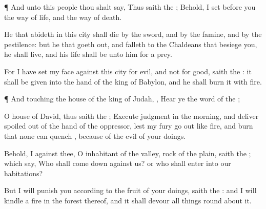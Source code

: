 {\par }{\PP {}¶ And unto this
people thou shalt
say, Thus
saith the
{}; Behold, I
set
before you the
way of
life, and the
way of
death.

He that
abideth in this
city shall
die by the
sword, and by the
famine, and by the
pestilence: but he that goeth
out, and
falleth to the
Chaldeans that
besiege you, he shall
live, and his
life shall be unto him for a
prey.

For I have
set my
face against this
city for
evil, and not for
good,
saith the
{}: it shall be
given into the
hand of the
king of
Babylon, and he shall
burn it with
fire.


\par }{\PP {}¶ And touching the
house of the
king of
Judah,
{},
Hear ye the
word of the
{};

O
house of
David, thus
saith the
{};
Execute
judgment in the
morning, and
deliver
{}
spoiled out of the
hand of the
oppressor, lest my
fury go
out like
fire, and
burn that none can
quench
{},
because of the
evil of your
doings.

Behold, I
{} against thee, O
inhabitant of the
valley,
{}
rock of the
plain,
saith the
{}; which
say, Who shall come
down against us? or who shall
enter into our
habitations?

But I will
punish you according to the
fruit of your
doings,
saith the
{}: and I will
kindle a
fire in the
forest thereof, and it shall
devour all things round
about it.




\par }
